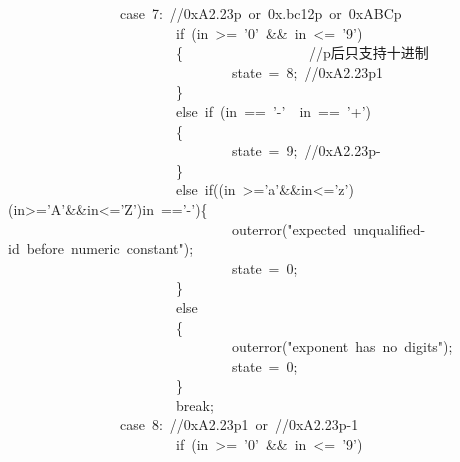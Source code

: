 \documentclass{article}
\begin{document}
\begin{mdpre}
~~~~~~~~~~~~~~~~{case}~{7}:~{//0xA2.23p~or~0x.bc12p~or~0xABCp}\\
~~~~~~~~~~~~~~~~~~~~~~~~{if}~(in~\textgreater{}=~{'0'}~\&\&~in~\textless{}=~{'9'})\\
~~~~~~~~~~~~~~~~~~~~~~~~\{~~~~~~~~~~~~~~~~~~{//p后只支持十进制}\\
~~~~~~~~~~~~~~~~~~~~~~~~~~~~~~~~state~=~{8};~{//0xA2.23p1}\\
~~~~~~~~~~~~~~~~~~~~~~~~\}\\
~~~~~~~~~~~~~~~~~~~~~~~~{else}~{if}~(in~==~{'-'}~\textbar{}\textbar{}~in~==~{'+'})\\
~~~~~~~~~~~~~~~~~~~~~~~~\{\\
~~~~~~~~~~~~~~~~~~~~~~~~~~~~~~~~state~=~{9};~{//0xA2.23p-}\\
~~~~~~~~~~~~~~~~~~~~~~~~\}\\
~~~~~~~~~~~~~~~~~~~~~~~~{else}~{if}((in~\textgreater{}={'a'}\&\&in\textless{}={'z'})\textbar{}\textbar{}(in\textgreater{}={'A'}\&\&in\textless{}={'Z'})\textbar{}\textbar{}in~=={'-'})\{\\
~~~~~~~~~~~~~~~~~~~~~~~~~~~~~~~~outerror({"}{expected~unqualified-id~before~numeric~constant}{"});\\
~~~~~~~~~~~~~~~~~~~~~~~~~~~~~~~~state~=~{0};\\
~~~~~~~~~~~~~~~~~~~~~~~~\}\\
~~~~~~~~~~~~~~~~~~~~~~~~{else}\\
~~~~~~~~~~~~~~~~~~~~~~~~\{\\
~~~~~~~~~~~~~~~~~~~~~~~~~~~~~~~~outerror({"}{exponent~has~no~digits}{"});\\
~~~~~~~~~~~~~~~~~~~~~~~~~~~~~~~~state~=~{0};\\
~~~~~~~~~~~~~~~~~~~~~~~~\}\\
~~~~~~~~~~~~~~~~~~~~~~~~{break};\\
~~~~~~~~~~~~~~~~{case}~{8}:~{//0xA2.23p1~or~//0xA2.23p-1}\\
~~~~~~~~~~~~~~~~~~~~~~~~{if}~(in~\textgreater{}=~{'0'}~\&\&~in~\textless{}=~{'9'})\\

\end{mdpre}
\end{document}
